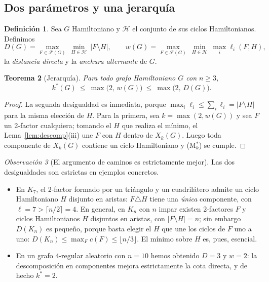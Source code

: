 \documentclass[11pt,a4paper]{article}
\newtheorem{teorema}{Teorema}[section]
\theoremstyle{definition}
\newtheorem{definicion}[teorema]{Definición}
\theoremstyle{remark}
\newtheorem{observacion}[teorema]{Observación}
\begin{document}
\subsection{Dos parámetros y una jerarquía}

\begin{definicion}
Sea $G$ Hamiltoniano y $\mathcal{H}$ el conjunto de sus ciclos Hamiltonianos. Definimos
\[
D(G)=\max_{F\in\mathcal{F}(G)}\ \min_{H\in\mathcal{H}}\ |F\setminus H|,
\qquad
w(G)=\max_{F\in\mathcal{F}(G)}\ \min_{H\in\mathcal{H}}\ \max_i \ell_i(F,H),
\]
la \emph{distancia directa} y la \emph{anchura alternante} de $G$.
\end{definicion}

\begin{teorema}[Jerarquía]\label{thm:jerarquia}
Para todo grafo Hamiltoniano $G$ con $n\ge3$,
\[
k^*(G)\ \le\ \max\big(2,\,w(G)\big)\ \le\ \max\big(2,\,D(G)\big).
\]
\end{teorema}

\begin{proof}
La segunda desigualdad es inmediata, porque $\max_i\ell_i\le\sum_i\ell_i=|F\setminus H|$ para la misma elección de $H$. Para la primera, sea $k=\max(2,w(G))$ y sea $F$ un 2-factor cualquiera; tomando el $H$ que realiza el mínimo, el Lema~\ref{lem:descomp}(iii) une $F$ con $H$ dentro de $X_k(G)$. Luego toda componente de $X_k(G)$ contiene un ciclo Hamiltoniano y (M$^*_k$) se cumple.
\end{proof}

\begin{observacion}[El argumento de caminos es estrictamente mejor]\label{obs:ko}
Las dos desigualdades son estrictas en ejemplos concretos.
\begin{itemize}
\item En $K_7$, el 2-factor formado por un triángulo y un cuadrilátero admite un ciclo Hamiltoniano $H$ disjunto en aristas: $F\triangle H$ tiene una \emph{única} componente, con $\ell=7>\lceil n/2\rceil=4$. En general, en $K_n$ con $n$ impar existen 2-factores $F$ y ciclos Hamiltonianos $H$ disjuntos en aristas, con $|F\setminus H|=n$; sin embargo $D(K_n)$ es pequeño, porque basta elegir el $H$ que une los ciclos de $F$ uno a uno: $D(K_n)\le\max_F c(F)\le\lfloor n/3\rfloor$. El mínimo sobre $H$ es, pues, esencial.
\item En un grafo $4$-regular aleatorio con $n=10$ hemos obtenido $D=3$ y $w=2$: la descomposición en componentes mejora estrictamente la cota directa, y de hecho $k^*=2$.
\end{itemize}
\end{observacion}
\end{document}
